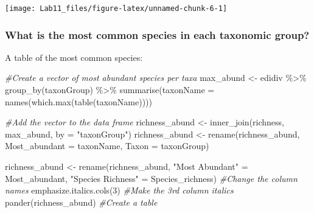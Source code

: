 \documentclass[
  12pt,
]{article}
\newenvironment{Shaded}{\begin{snugshade}}{\end{snugshade}}
\newcommand{\AttributeTok}[1]{\textcolor[rgb]{0.77,0.63,0.00}{#1}}
\newcommand{\CommentTok}[1]{\textcolor[rgb]{0.56,0.35,0.01}{\textit{#1}}}
\newcommand{\DecValTok}[1]{\textcolor[rgb]{0.00,0.00,0.81}{#1}}
\newcommand{\FunctionTok}[1]{\textcolor[rgb]{0.00,0.00,0.00}{#1}}
\newcommand{\NormalTok}[1]{#1}
\newcommand{\OtherTok}[1]{\textcolor[rgb]{0.56,0.35,0.01}{#1}}
\newcommand{\SpecialCharTok}[1]{\textcolor[rgb]{0.00,0.00,0.00}{#1}}
\newcommand{\StringTok}[1]{\textcolor[rgb]{0.31,0.60,0.02}{#1}}
\begin{document}
\begin{center}\texttt{[image: Lab11\_files/figure-latex/unnamed-chunk-6-1]} \end{center}

\hypertarget{what-is-the-most-common-species-in-each-taxonomic-group}{%
\subsubsection{What is the most common species in each taxonomic
group?}\label{what-is-the-most-common-species-in-each-taxonomic-group}}

A table of the most common species:

\begin{Shaded}
\begin{Highlighting}[]
\CommentTok{\#Create a vector of most abundant species per taxa}
\NormalTok{max\_abund }\OtherTok{\textless{}{-}}
\NormalTok{  edidiv }\SpecialCharTok{\%\textgreater{}\%}
    \FunctionTok{group\_by}\NormalTok{(taxonGroup) }\SpecialCharTok{\%\textgreater{}\%}
    \FunctionTok{summarise}\NormalTok{(}\AttributeTok{taxonName =} \FunctionTok{names}\NormalTok{(}\FunctionTok{which.max}\NormalTok{(}\FunctionTok{table}\NormalTok{(taxonName))))}

\CommentTok{\#Add the vector to the data frame}
\NormalTok{richness\_abund }\OtherTok{\textless{}{-}}
\FunctionTok{inner\_join}\NormalTok{(richness, max\_abund, }\AttributeTok{by =} \StringTok{"taxonGroup"}\NormalTok{)}
\NormalTok{richness\_abund }\OtherTok{\textless{}{-}} \FunctionTok{rename}\NormalTok{(richness\_abund, }\AttributeTok{Most\_abundant =}\NormalTok{  taxonName, }\AttributeTok{Taxon =}\NormalTok{ taxonGroup)}
\end{Highlighting}
\end{Shaded}

\begin{Shaded}
\begin{Highlighting}[]
\NormalTok{richness\_abund }\OtherTok{\textless{}{-}} \FunctionTok{rename}\NormalTok{(richness\_abund, }
                        \StringTok{"Most Abundant"} \OtherTok{=}\NormalTok{ Most\_abundant,}
                        \StringTok{"Species Richness"} \OtherTok{=}\NormalTok{ Species\_richness) }\CommentTok{\#Change the column names}
\FunctionTok{emphasize.italics.cols}\NormalTok{(}\DecValTok{3}\NormalTok{) }\CommentTok{\#Make the 3rd column italics}
\FunctionTok{pander}\NormalTok{(richness\_abund) }\CommentTok{\#Create a table}
\end{Highlighting}
\end{Shaded}
\end{document}
